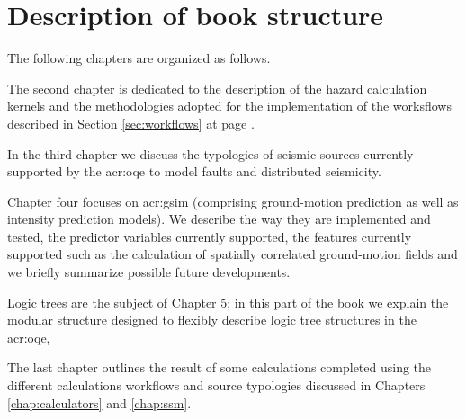 \section{Description of book structure}
The following chapters are organized as follows. 

The second chapter is dedicated to the description of the hazard calculation
kernels and the methodologies adopted for the implementation of the worksflows
described in Section \ref{sec:workflows} at page \pageref{sec:workflows}. 

In the third chapter we discuss the typologies of seismic sources currently
supported by the \gls{acr:oqe} to model faults and distributed seismicity.

Chapter four focuses on \gls{acr:gsim} (comprising ground-motion prediction as
well as intensity prediction models). We describe the way they are implemented
and tested, the predictor variables currently supported, the features currently
supported such as the calculation of spatially correlated ground-motion fields
and we briefly summarize possible future developments.
 
Logic trees are the subject of Chapter 5; in this part of the book we explain
the modular structure designed to flexibly describe logic tree structures in the
\gls{acr:oqe}, 
 
The last chapter outlines the result of some calculations completed using the
different calculations workflows and source typologies discussed in Chapters
\ref{chap:calculators} and \ref{chap:ssm}.
